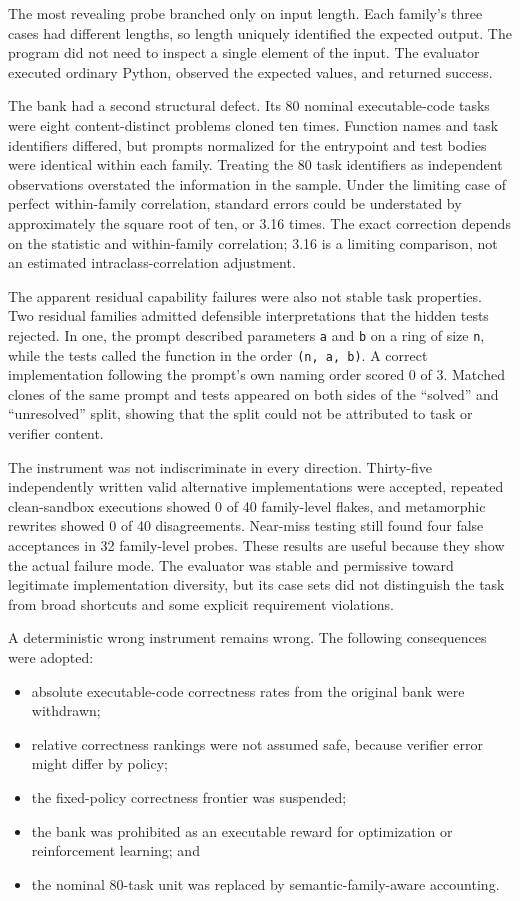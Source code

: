 \documentclass[
]{article}
\providecommand{\tightlist}{%
  \setlength{\itemsep}{0pt}\setlength{\parskip}{0pt}}
\begin{document}
The most revealing probe branched only on input length. Each family's
three cases had different lengths, so length uniquely identified the
expected output. The program did not need to inspect a single element of
the input. The evaluator executed ordinary Python, observed the expected
values, and returned success.

The bank had a second structural defect. Its 80 nominal executable-code
tasks were eight content-distinct problems cloned ten times. Function
names and task identifiers differed, but prompts normalized for the
entrypoint and test bodies were identical within each family. Treating
the 80 task identifiers as independent observations overstated the
information in the sample. Under the limiting case of perfect
within-family correlation, standard errors could be understated by
approximately the square root of ten, or 3.16 times. The exact
correction depends on the statistic and within-family correlation; 3.16
is a limiting comparison, not an estimated intraclass-correlation
adjustment.

The apparent residual capability failures were also not stable task
properties. Two residual families admitted defensible interpretations
that the hidden tests rejected. In one, the prompt described parameters
\texttt{a} and \texttt{b} on a ring of size \texttt{n}, while the tests
called the function in the order \texttt{(n,\ a,\ b)}. A correct
implementation following the prompt's own naming order scored 0 of 3.
Matched clones of the same prompt and tests appeared on both sides of
the ``solved'' and ``unresolved'' split, showing that the split could
not be attributed to task or verifier content.

The instrument was not indiscriminate in every direction. Thirty-five
independently written valid alternative implementations were accepted,
repeated clean-sandbox executions showed 0 of 40 family-level flakes,
and metamorphic rewrites showed 0 of 40 disagreements. Near-miss testing
still found four false acceptances in 32 family-level probes. These
results are useful because they show the actual failure mode. The
evaluator was stable and permissive toward legitimate implementation
diversity, but its case sets did not distinguish the task from broad
shortcuts and some explicit requirement violations.

A deterministic wrong instrument remains wrong. The following
consequences were adopted:

\begin{itemize}
\tightlist
\item
  absolute executable-code correctness rates from the original bank were
  withdrawn;
\item
  relative correctness rankings were not assumed safe, because verifier
  error might differ by policy;
\item
  the fixed-policy correctness frontier was suspended;
\item
  the bank was prohibited as an executable reward for optimization or
  reinforcement learning; and
\item
  the nominal 80-task unit was replaced by semantic-family-aware
  accounting.
\end{itemize}
\end{document}
